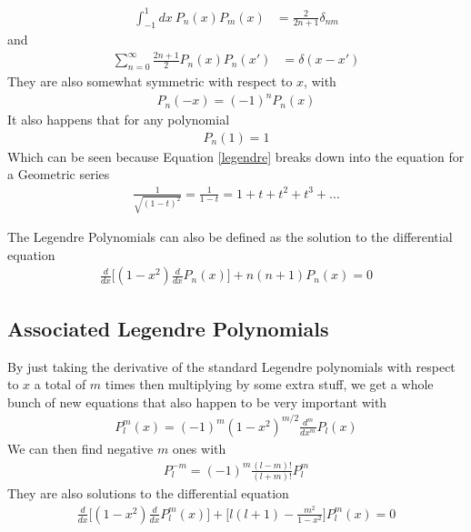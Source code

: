 \begin{align}
\int^1_{-1} dx~ P_n(x) P_{m}(x) &= \frac{2}{2n+1}\delta_{nm}
\end{align}
and 
\begin{align}
\sum_{n=0}^\infty \frac{2n+1}{2}P_n(x)P_n(x') &= \delta(x-x')
\end{align}
They are also somewhat symmetric with respect to $x$, with
\begin{align}
P_n(-x) = (-1)^nP_n(x)
\end{align}
It also happens that for any polynomial 
\begin{align}
P_n(1) = 1
\end{align}
Which can be seen because Equation \ref{legendre} breaks down into the equation for a Geometric series
\begin{align}
\frac{1}{\sqrt{(1-t)^2}} = \frac{1}{1-t} = 1 + t + t^2 + t^3 + ...
\end{align}



The Legendre Polynomials can also be defined as the solution to the differential equation
\begin{align}\label{legendrediffeq}
\frac{d}{dx}\Big[(1-x^2)\frac{d}{dx} P_n(x)\Big] + n(n+1)P_n(x) = 0
\end{align}






\subsection{Associated Legendre Polynomials}

By just taking the derivative of the standard Legendre polynomials with respect to $x$ a total of $m$ times then multiplying by some extra stuff, we get a whole bunch of new equations that also happen to be very important with
\begin{align}\label{associated}
P^m_l(x) = (-1)^m(1-x^2)^{m/2}\frac{d^m}{dx^m}P_l(x)
\end{align}
We can then find negative $m$ ones with
\begin{align}
P^{-m}_l = (-1)^m\frac{(l-m)!}{(l+m)!}P_l^m
\end{align}
They are also solutions to the differential equation
\begin{align}\label{associatedlegendre}
\frac{d}{dx}\Big[(1-x^2)\frac{d}{dx}P_l^m(x)\Big] + \Big[l(l+1) - \frac{m^2}{1-x^2}\Big]P_l^m(x) = 0
\end{align}

